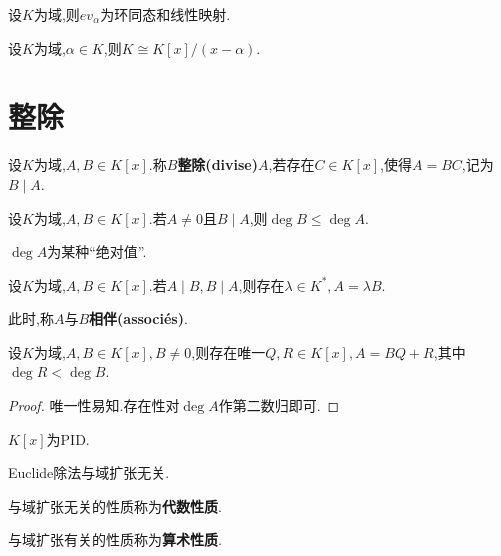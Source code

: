 \begin{rqq}
    设$K$为域,则$ev_{\alpha}$为环同态和线性映射.
\end{rqq}

\begin{rqq}
    设$K$为域,$\alpha \in K$,则$K \cong K[x] / (x - \alpha)$.
\end{rqq}

\section{整除}

\begin{deff}
    设$K$为域,$A, B \in K[x]$.称$B$\textbf{整除(divise)}$A$,若存在$C \in K[x]$,使得$A = BC$,记为$B \mid A$.
\end{deff}

\begin{prop}
    设$K$为域,$A, B \in K[x]$.若$A \neq 0$且$B \mid A$,则$\deg B \leqslant \deg A$.
\end{prop}

\begin{rqq}
    $\deg A$为某种``绝对值''.
\end{rqq}

\begin{prop}
    设$K$为域,$A, B \in K[x]$.若$A \mid B, B \mid A$,则存在$\lambda \in K^*, A = \lambda B$.

    此时,称$A$与$B$\textbf{相伴(associés)}.
\end{prop}

\begin{thm}[Euclide除法]
    设$K$为域,$A, B \in K[x], B \neq 0$,则存在唯一$Q, R \in K[x], A = BQ + R$,其中$\deg R < \deg B$.
\end{thm}

\begin{proof}
    唯一性易知.存在性对$\deg A$作第二数归即可.
\end{proof}

\begin{rqq}
    $K[x]$为PID.
\end{rqq}

\begin{rqq}
    Euclide除法与域扩张无关.
\end{rqq}

\begin{rqq}
    与域扩张无关的性质称为\textbf{代数性质}.

    与域扩张有关的性质称为\textbf{算术性质}.
\end{rqq}

